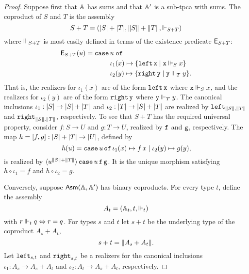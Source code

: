 \begin{proof}
  Suppose first that $\AA$ has sums and that $\subAA$ is a sub-tpca
  with sums. The coproduct of $S$ and $T$ is the assembly
  \begin{equation*}
    S + T = (\S{S} + \S{T}, \T{S} + \T{T}, \rz[S + T])
  \end{equation*}
  where $\rz[S+T]$ is most easily defined in terms of the existence
  predicate $\Ex{S+T}$:
  \begin{equation*}
    \Ex{S+T}(u) =
    \xcase{u}
    {\iota_1(x)}{\set{\combLeft\,\R{x} \such \R{x} \rz[S] x}}
    {\iota_2(y)}{\set{\combRight\,\R{y} \such \R{y} \rz[T] y}.}
  \end{equation*}
  That is, the realizers for $\iota_1(x)$ are of the form
  $\combLeft\,\R{x}$ where $\R{x} \rz[S] x$, and the realizers for
  $\iota_2(y)$ are of the form $\combRight\,\R{y}$ where $\R{y} \rz[T]
  y$. The canonical inclusions $\iota_1 : \S{S} \to \S{S} + \S{T}$ and $\iota_2 :
  \S{T} \to \S{S} + \S{T}$ are realized by $\combLeft_{\T{S},\T{T}}$ and
  $\combRight_{\T{S},\T{T}}$, respectively.
  To see that $S + T$ has the required universal property,
  consider $f : S \to U$ and $g : T \to U$,
  realized by $\R{f}$ and $\R{g}$, respectively. The map $h = [f,g] :
  \S{S} + \S{T} \to \S{U}$, defined by
  \begin{equation*}
    h(u) = \case{u}{\iota_1(x)}{f\,x}{\iota_2(y)}{g(y)},
  \end{equation*}
  is realized by
  $\tpcalam{u}{\T{S}+\T{T}}{\combCase\,u\,\R{f}\,\R{g}}$. It is the
  unique morphism satisfying $h \circ \iota_1 = f$ and $h \circ
  \iota_2 = g$.

  Conversely, suppose $\AsmA$ has binary coproducts. For every type
  $t$, define the assembly
  \begin{equation*}
    A_t = (\Atyp{t}, t, {\rz[t]})
  \end{equation*}
  with $r \rz[t] q \liff r = q$. For types $s$ and $t$ let $s+t$ be the
  underlying type of the coproduct $A_s + A_t$,
  \begin{equation*}
    s + t = \T{A_s + A_t}.
  \end{equation*}
  Let $\combLeft_{s,t}$ and $\combRight_{s,t}$ be a realizers for the
  canonical inclusions $\iota_1 : A_s \to A_s + A_t$
  and $\iota_2 : A_t \to A_s + A_t$, respectively.


\end{proof}
